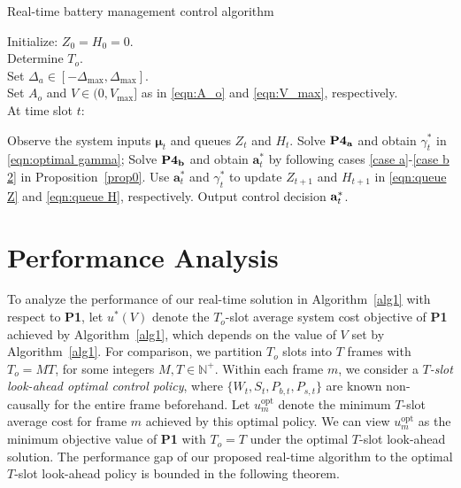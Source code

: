\documentclass[journal]{IEEEtran}
\def\mubf{\boldsymbol \mu }
\def\abf{{\bf a}}
\begin{document}
\begin{algorithm}[t]
\caption{Real-time battery management control algorithm}\label{alg1}
Initialize: $Z_0=H_0=0$.\\
Determine $T_o$.\\
Set $\Delta_a\in [-\Delta_{\max},\Delta_{\max}]$.\\
Set $A_o$ and $V\in(0,V_{\max}]$ as in \eqref{eqn:A_o} and \eqref{eqn:V_max}, respectively.\\
At time slot $t$:
\begin{algorithmic}[1]
\State Observe the system inputs $\mubf_t$ and queues $Z_t$ and $H_t$.
\State Solve ${\bf \text{\bf P4}_{a}}$ and obtain $\gamma^*_t$ in \eqref{eqn:optimal gamma}; Solve ${\bf \text{\bf P4}_{b}}$ and obtain $\mathbf{a}^*_t$ by following cases \eqref{case a}-\eqref{case b 2} in Proposition~\ref{prop0}.
\State Use $\mathbf{a}^*_t$ and $\gamma^*_t$ to update $Z_{t+1}$ and $H_{t+1}$ in \eqref{eqn:queue Z} and \eqref{eqn:queue H}, respectively.
\State Output control decision $\abf_t^*$.
\end{algorithmic}
\end{algorithm}

\section{Performance Analysis}\label{sec:PA}
To analyze the performance of our real-time solution in Algorithm~\ref{alg1} with respect to {\bf P1}, let $u^*(V)$ denote the $T_o$-slot average system cost objective  of {\bf P1} achieved by Algorithm~\ref{alg1}, which depends on  the value of $V$ set by Algorithm~\ref{alg1}.   For comparison, we partition $T_o$ slots into $T$ frames with $T_o=MT$, for some integers $M,T\in \mathbb{N}^+$. Within each frame $m$, we consider a \emph{$T$-slot look-ahead optimal control policy}, where $\{W_t,S_t,P_{b,t},P_{s,t}\}$ are known non-causally for the entire frame beforehand. Let $u_m^\textrm{opt}$ denote the minimum $T$-slot average cost for frame $m$ achieved by this optimal policy. We can view $u_m^\textrm{opt}$ as the minimum objective value of {\bf P1} with $T_o = T$ under the optimal $T$-slot look-ahead solution. The  performance gap of our proposed real-time algorithm  to the optimal $T$-slot look-ahead policy is bounded in the following theorem.
\end{document}
